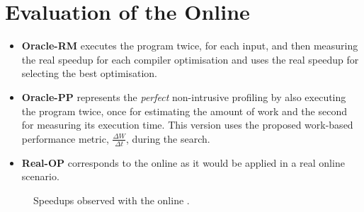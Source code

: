 \section{Evaluation of the Online {\IterComp}}

\begin{itemize}
\item \textbf{Oracle-RM} executes the program twice, for each input, and then measuring the real speedup for each compiler optimisation and uses the real speedup for selecting the best optimisation.
\item \textbf{Oracle-PP} represents the \textit{perfect} non-intrusive profiling by also executing the program twice, once for estimating the amount of work and the second for measuring its execution time.
This version uses the proposed work-based performance metric, $\frac{\Delta W}{\Delta t}$, during the {\itercomp} search.
\item \textbf{Real-OP} corresponds to the online {\itercomp} as it would be applied in a real online scenario.

\end{itemize}

\begin{figure}[htb]
    \centering
    \caption{Speedups observed with the online {\itercomp}.}
    \label{fig:speedups}
\end{figure}

